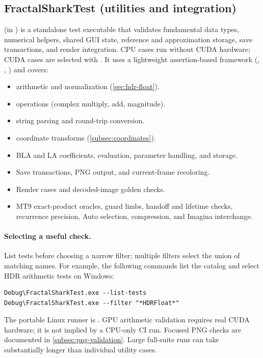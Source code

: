 \subsection{FractalSharkTest (utilities and integration)}
\label{subsec:fractalsharktest}

 (in ) is a standalone
test executable that validates fundamental data types, numerical helpers,
shared GUI state, reference and approximation storage, save transactions, and
render integration. CPU cases run without CUDA hardware; CUDA cases are selected
with .  It uses a lightweight
assertion-based framework (, ,
) and covers:

\begin{itemize}
  \item {} arithmetic and normalization
        (\cref{sec:hdr-float}).
  \item {} operations (complex multiply, add,
        magnitude).
  \item {} string parsing and round-trip conversion.
  \item {} coordinate transforms
        (\cref{subsec:coordinates}).
  \item BLA and LA coefficients, evaluation, parameter handling, and storage.
  \item Save transactions, PNG output, and current-frame recoloring.
  \item Render cases and decoded-image golden checks.
  \item MT9 exact-product oracles, guard limbs, handoff and lifetime checks,
        recurrence precision, Auto selection, compression, and Imagina interchange.
\end{itemize}

\paragraph{Selecting a useful check.}
List tests before choosing a narrow filter; multiple filters select the union of
matching names. For example, the following commands list the catalog and select
HDR arithmetic tests on Windows:
\begin{lstlisting}[language={}]
Debug\FractalSharkTest.exe --list-tests
Debug\FractalSharkTest.exe --filter "*HDRFloat*"
\end{lstlisting}
The portable Linux runner is
. GPU arithmetic validation
requires real CUDA hardware; it is not implied by a CPU-only CI run. Focused
PNG checks are documented in \cref{subsec:png-validation}. Large full-suite runs
can take substantially longer than individual utility cases.

